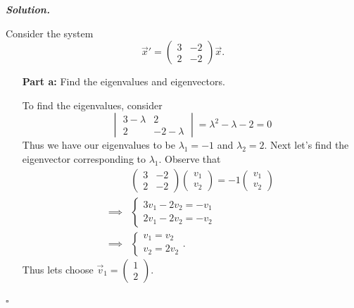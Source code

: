 \documentclass[12pt]{report}
\newenvironment{solution}[1][\it{Solution}]{\textbf{#1. } }{$\square$}
\begin{document}
\begin{solution}

    \noindent
    Consider the system
    \[ \vec{x}' = \begin{pmatrix}
        3 & -2\\
        2 & -2
    \end{pmatrix}\vec{x}.\]
    \begin{enumerate}
        \item [{\bf Part a:}] Find the eigenvalues and eigenvectors.
        
        \noindent
        To find the eigenvalues, consider
        \[
            \begin{vmatrix}
                3 - \lambda & 2\\
                2 & -2 - \lambda
            \end{vmatrix} = \lambda^2 - \lambda - 2 = 0
        \]
        Thus we have our eigenvalues to be $\lambda_1 = -1$ and $\lambda_2 = 2$. 
        Next let's find the eigenvector corresponding to $\lambda_1$. Observe that
        \begin{align*}
            &\begin{pmatrix}
                3 & -2\\
                2 & -2
            \end{pmatrix}\begin{pmatrix}
                v_1\\
                v_2
            \end{pmatrix} = -1 \begin{pmatrix}
                v_1\\
                v_2
            \end{pmatrix}\\
            \implies & \begin{cases}
                3v_1 - 2v_2 = -v_1\\
                2v_1 - 2v_2 = -v_2
            \end{cases}\\
            \implies &\begin{cases}
                v_1 = v_2\\
                v_2 = 2v_2
            \end{cases}.
        \end{align*}
        Thus lets choose $\vec{v}_1 = \begin{pmatrix}
            1\\
            2
        \end{pmatrix}$.

\end{enumerate}
\end{solution}
\end{document}
